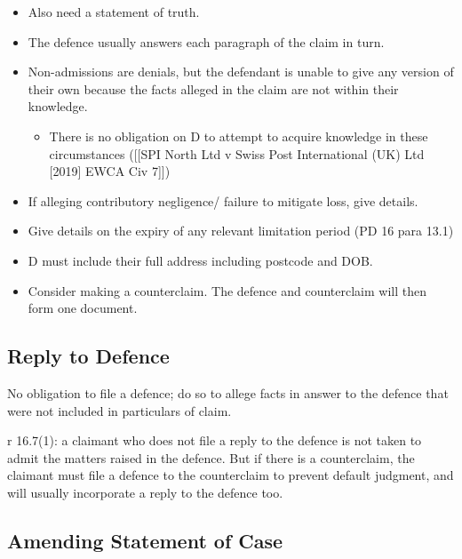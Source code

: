 \documentclass[
]{article}
\providecommand{\tightlist}{%
  \setlength{\itemsep}{0pt}\setlength{\parskip}{0pt}}
\begin{document}
\begin{itemize}
\tightlist
\item
  Also need a statement of truth.
\item
  The defence usually answers each paragraph of the claim in turn.
\item
  Non-admissions are denials, but the defendant is unable to give any
  version of their own because the facts alleged in the claim are not
  within their knowledge.

  \begin{itemize}
  \tightlist
  \item
    There is no obligation on D to attempt to acquire knowledge in these
    circumstances ({[}{[}SPI North Ltd v Swiss Post International (UK)
    Ltd {[}2019{]} EWCA Civ 7{]}{]})
  \end{itemize}
\item
  If alleging contributory negligence/ failure to mitigate loss, give
  details.
\item
  Give details on the expiry of any relevant limitation period (PD 16
  para 13.1)
\item
  D must include their full address including postcode and DOB.
\item
  Consider making a counterclaim. The defence and counterclaim will then
  form one document.
\end{itemize}

\hypertarget{reply-to-defence}{%
\subsection{Reply to Defence}\label{reply-to-defence}}

No obligation to file a defence; do so to allege facts in answer to the
defence that were not included in particulars of claim.

r 16.7(1): a claimant who does not file a reply to the defence is not
taken to admit the matters raised in the defence. But if there is a
counterclaim, the claimant must file a defence to the counterclaim to
prevent default judgment, and will usually incorporate a reply to the
defence too.

\hypertarget{amending-statement-of-case}{%
\subsection{Amending Statement of
Case}\label{amending-statement-of-case}}
\end{document}
